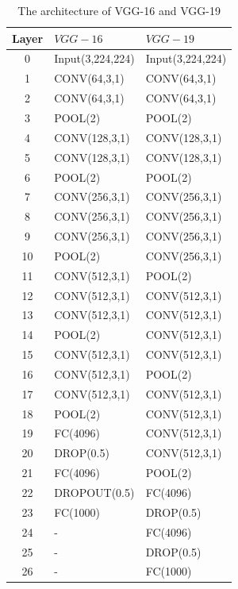 \documentclass[12pt,a4paper]{article}
\begin{document}
\begin{table}[h!]
	\centering
	\begin{tabular}{c l l}
	Layer & $VGG-16$ & $VGG-19$ \\ \hline
	0 & Input(3,224,224) & Input(3,224,224) \\ \hline
	1 & CONV(64,3,1) & CONV(64,3,1) \\ \hline
	2 & CONV(64,3,1) & CONV(64,3,1) \\ \hline
	3 & POOL(2) &  POOL(2) \\ \hline
	4 & CONV(128,3,1) & CONV(128,3,1) \\ \hline
	5 & CONV(128,3,1) & CONV(128,3,1) \\ \hline
	6 & POOL(2) &  POOL(2) \\ \hline
	7 & CONV(256,3,1) & CONV(256,3,1) \\ \hline
	8 & CONV(256,3,1) & CONV(256,3,1) \\ \hline
	9 & CONV(256,3,1) & CONV(256,3,1) \\ \hline
	10 & POOL(2) &  CONV(256,3,1) \\ \hline
	11 & CONV(512,3,1) & POOL(2) \\ \hline
	12 & CONV(512,3,1) & CONV(512,3,1) \\ \hline
	13 & CONV(512,3,1) & CONV(512,3,1) \\ \hline
	14 & POOL(2) &  CONV(512,3,1) \\ \hline
	15 & CONV(512,3,1) & CONV(512,3,1) \\ \hline
	16 & CONV(512,3,1) & POOL(2) \\ \hline
	17 & CONV(512,3,1) & CONV(512,3,1) \\ \hline
	18 & POOL(2) &  CONV(512,3,1) \\ \hline
	19 & FC(4096) & CONV(512,3,1) \\ \hline
	20 & DROP(0.5) & CONV(512,3,1) \\ \hline
	21 & FC(4096) & POOL(2) \\ \hline
	22 & DROPOUT(0.5) &  FC(4096) \\ \hline
	23 & FC(1000) & DROP(0.5) \\ \hline
	24 & - & FC(4096) \\ \hline
	25 & - &  DROP(0.5) \\ \hline
	26 & - &  FC(1000) \\ \hline
	\end{tabular}
	\caption{The architecture of VGG-16 and VGG-19}
	\label{VGGmodels}
\end{table}
\end{document}

